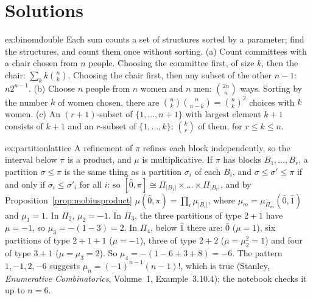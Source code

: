 \section{Solutions}

\begin{solution}{ex:binomdouble}
\idea Each sum counts a set of structures sorted by a parameter; find the structures, and count them once without sorting.
\writeup (a) Count committees with a chair chosen from $n$ people. Choosing the committee first, of size $k$, then the chair: $\sum_kk\binom nk$.
Choosing the chair first, then any subset of the other $n-1$: $n2^{n-1}$. (b) Choose $n$ people from $n$ women and $n$ men: $\binom{2n}n$ ways. Sorting
by the number $k$ of women chosen, there are $\binom nk\binom n{n-k}=\binom nk^2$ choices with $k$ women. (c) An $(r+1)$-subset of $\{1,\dots,n+1\}$ with largest element
$k+1$ consists of $k+1$ and an $r$-subset of $\{1,\dots,k\}$: $\binom kr$ of them, for $r\le k\le n$.
\end{solution}

\begin{solution}{ex:partitionlattice}
\idea A refinement of $\pi$ refines each block independently, so the interval below $\pi$ is a product, and $\mu$ is multiplicative.
\writeup If $\pi$ has blocks $B_1,\dots,B_r$, a partition $\sigma\le\pi$ is the same thing as a partition $\sigma_i$ of each $B_i$, and $\sigma\le\sigma'\le\pi$ if and only if
$\sigma_i\le\sigma'_i$ for all $i$: so $[\hat0,\pi]\cong\Pi_{|B_1|}\times\dots\times\Pi_{|B_r|}$, and by Proposition~\ref{prop:mobiusproduct} $\mu(\hat0,\pi)=\prod_i\mu_{|B_i|}$, where
$\mu_m=\mu_{\Pi_m}(\hat0,\hat1)$ and $\mu_1=1$. In $\Pi_2$, $\mu_2=-1$. In $\Pi_3$, the three partitions of type $2+1$ have $\mu=-1$, so $\mu_3=-(1-3)=2$.
In $\Pi_4$, below $\hat1$ there are: $\hat0$ ($\mu=1$), six partitions of type $2+1+1$ ($\mu=-1$), three of type $2+2$ ($\mu=\mu_2^2=1$) and four of type
$3+1$ ($\mu=\mu_3=2$). So $\mu_4=-(1-6+3+8)=-6$. The pattern $1,-1,2,-6$ suggests $\mu_n=(-1)^{n-1}(n-1)!$, which is true (Stanley,
\emph{Enumerative Combinatorics}, Volume~1, Example~3.10.4); the notebook checks it up to $n=6$.
\end{solution}

